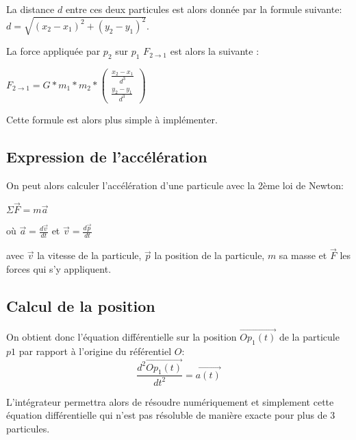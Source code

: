 La distance $d$ entre ces deux particules est alors donnée par la formule suivante:
$d= \sqrt{(x_2-x_1)^2 + (y_2 - y_1)^2}$.

La force appliquée par $p_2$ sur $p_1$ $F_{2 \rightarrow 1}$ est alors la suivante :

\begin{center}
$F_{2 \rightarrow 1}=G*m_1*m_2*\begin{pmatrix}
\frac{x_2 -x_1}{d^3}\\
\frac{y_2 -y_1}{d^3}
\end{pmatrix}
$
\end{center}

\vspace{2mm}
Cette formule est alors plus simple à implémenter.

\vspace{3mm}
\subsection{Expression de l'accélération}
\vspace{2mm}

On peut alors calculer l'accélération d'une particule avec la 2ème loi de Newton:
\begin{center}
    


$\Sigma \vec{F} = m \vec{a}$

\vspace{2mm}
où 
$\vec{a}=\frac{d\vec{v}}{dt}$ et $ \vec{v}= \frac{d\vec{p}}{dt}$


\end{center}

avec $\vec{v}$ la vitesse de la particule, $\vec{p}$ la position de la particule, $m$ sa masse et $\vec{F}$ les forces qui s'y appliquent.

\subsection{Calcul de la position}

On obtient donc l'équation différentielle sur la position $\vec{Op_1(t)}$ de la particule $p1$ par rapport à l'origine du référentiel $O$:
\begin{equation}
\frac{d^2 \vec{Op_1(t)}}{dt^2} = \vec{a(t)}
\end{equation}

L'intégrateur permettra alors de résoudre numériquement et simplement cette équation différentielle qui n'est pas résoluble de manière exacte pour plus de $3$ particules.

